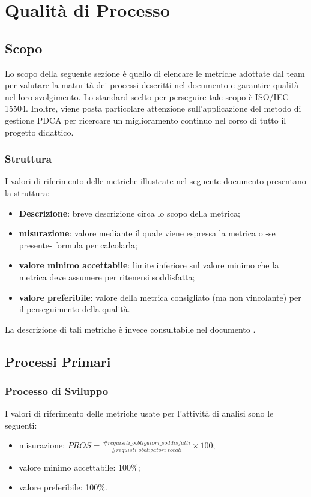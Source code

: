 \section{Qualità di Processo}

\subsection{Scopo}
Lo scopo della seguente sezione è quello di elencare le metriche adottate dal team \Gruppo{} per valutare la maturità dei processi descritti nel documento \textit{\NdP} e garantire qualità nel loro svolgimento. Lo standard scelto per perseguire tale scopo è ISO/IEC 15504. Inoltre, viene posta particolare attenzione sull'applicazione del metodo di gestione PDCA per ricercare un miglioramento continuo nel corso di tutto il progetto didattico.

\subsubsection{Struttura}
I valori di riferimento delle metriche illustrate nel seguente documento presentano la struttura:
\begin{itemize}
	\item{\textbf{Descrizione}: breve descrizione circa lo scopo della metrica;}
	\item{\textbf{misurazione}: valore mediante il quale viene espressa la metrica o -se presente- formula per calcolarla;}
	\item{\textbf{valore minimo accettabile}: limite inferiore sul valore minimo che la metrica deve assumere per ritenersi soddisfatta;}
	\item{\textbf{valore preferibile}: valore della metrica consigliato (ma non vincolante) per il perseguimento della qualità.}
\end{itemize}
La descrizione di tali metriche è invece consultabile nel documento \NdP.

\subsection{Processi Primari}

	\subsubsection{Processo di Sviluppo}
	
		I valori di riferimento delle metriche usate per l'attività di analisi sono le seguenti:
				\begin{itemize}
					\item{misurazione: $PROS = \displaystyle\frac{\#requisiti\_obbligatori\_soddisfatti}{\#requisti\_obbligatori\_totali} \times 100$;}
					\item{valore minimo accettabile: 100\%;}
					\item{valore preferibile: 100\%.}
				\end{itemize}

